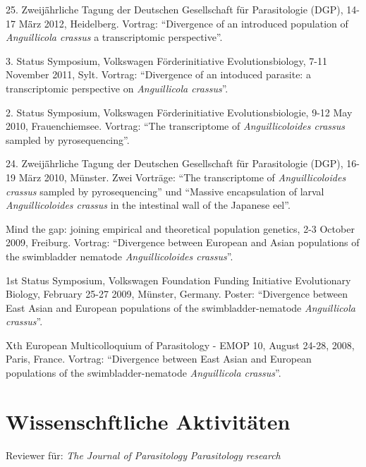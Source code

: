 \documentclass[10pt,a4paper]{article}
\renewenvironment{itemize}{
  \begin{list}{}{
    \setlength{\leftmargin}{2.5em}
    \setlength{\itemsep}{0.25em}
    \setlength{\parskip}{0pt}
    \setlength{\parsep}{0.25em}
  }
}{
  \end{list}
}
\begin{document}
\begin{itemize}

\item 25. Zweij\"ährliche Tagung der Deutschen Gesellschaft f\"ur
  Parasitologie (DGP), 14-17 M\"ärz 2012, Heidelberg. Vortrag:
  ``Divergence of an introduced population of \textit{Anguillicola
    crassus} a transcriptomic perspective''.

\item 3. Status Symposium, Volkswagen Förderinitiative
  Evolutionsbiology, 7-11 November 2011, Sylt. Vortrag: ``Divergence
  of an intoduced parasite: a transcriptomic perspective on
  \textit{Anguillicola crassus}''.

\item 2. Status Symposium, Volkswagen F\"orderinitiative
  Evolutionsbiologie, 9-12 May 2010, Frauenchiemsee. Vortrag: ``The
  transcriptome of \textit{Anguillicoloides crassus} sampled by
  pyrosequencing''.

\item 24. Zweij\"ährliche Tagung der Deutschen Gesellschaft f\"ur
  Parasitologie (DGP), 16-19 M\"arz 2010, M\"unster. Zwei
  Vortr\"age: ``The transcriptome of \textit{Anguillicoloides crassus}
  sampled by pyrosequencing'' und ``Massive encapsulation of larval
  \textit{Anguillicoloides crassus} in the intestinal wall of the
  Japanese eel''.

\item Mind the gap: joining empirical and theoretical population
  genetics, 2-3 October 2009, Freiburg. Vortrag: ``Divergence between
  European and Asian populations of the swimbladder nematode
  \textit{Anguillicoloides crassus}''.

\item 1st Status Symposium, Volkswagen Foundation Funding Initiative
  Evolutionary Biology, February 25-27 2009, M\"unster,
  Germany. Poster: ``Divergence between East Asian and European
  populations of the swimbladder-nematode \textit{Anguillicola
    crassus}''.

\item Xth European Multicolloquium of Parasitology - EMOP 10, August
  24-28, 2008, Paris, France. Vortrag: ``Divergence between
  East Asian and European populations of the swimbladder-nematode
  \textit{Anguillicola crassus}''.

\end{itemize}

\section*{Wissenschftliche Aktivit\"aten}
\begin{itemize}
\item Reviewer f\"ur:\newline
  \textit{The Journal of Parasitology}\newline
  \textit{Parasitology research}
\end{itemize}
\end{document}
